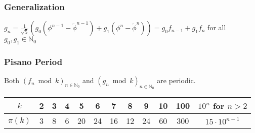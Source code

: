 \documentclass[9pt]{article}   	%
\begin{document}
\subsubsection{Generalization}
$g_n = \frac{1}{\sqrt{5}} (g_0 (\phi^{n-1} - \tilde{\phi}^{n-1}) + g_1 (\phi^n - \tilde{\phi}^n)) = g_0 f_{n-1} + g_1 f_n$ for all $g_0, g_1 \in \mathbb{N}_0$

\subsubsection{Pisano Period}
Both $(f_n \bmod k)_{n \in \mathbb{N}_0}$ and $(g_n \bmod k)_{n \in \mathbb{N}_0}$ are periodic.
\begin{table}[htbp]
\begin{tabular}{| c || c | c | c | c | c | c | c | c | c | c | c | }
\hline
$k$ & 2 & 3 & 4 & 5 & 6 & 7 & 8 & 9 & 10 & 100 & $10^n$ for $n >2$ \\
\hline
$\pi(k)$ & 3 & 8 & 6 & 20 & 24 & 16 & 12 & 24 & 60 & 300 & $15 \cdot 10^{n-1}$ \\
\hline
\end{tabular}
\end{table}
\end{document}
